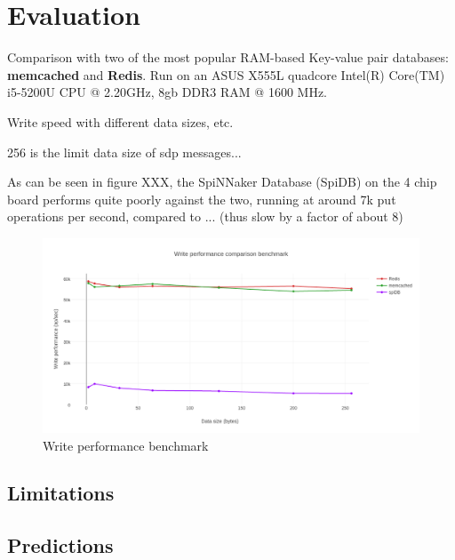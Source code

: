 \chapter{Evaluation}
\label{cha:eval}


Comparison with two of the most popular RAM-based Key-value pair databases: \textbf{memcached} and \textbf{Redis}.
Run on an ASUS X555L quadcore Intel(R) Core(TM) i5-5200U CPU @ 2.20GHz, 8gb DDR3 RAM @ 1600 MHz.

Write speed with different data sizes, etc.

256 is the limit data size of sdp messages...

As can be seen in figure XXX, the SpiNNaker Database (SpiDB) on the 4 chip board performs quite poorly against the two, running at around 7k put operations per second, compared to ... (thus slow by a factor of about 8) 


\begin{figure}
\begin{center}
	\includegraphics[width=1\textwidth, natwidth=1063, natheight=550]{images/write_performance.png}
\end{center}
\caption{Write performance benchmark}
\label{fig:die-plot}
\end{figure}

\section{Limitations}

\section{Predictions}